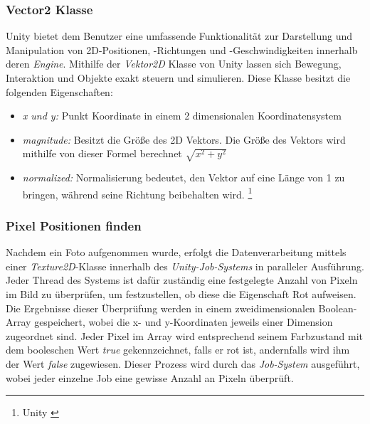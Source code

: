 \subsubsection{\label{sec:Vector2}Vector2 Klasse}
Unity bietet dem Benutzer eine umfassende Funktionalität zur Darstellung und Manipulation von 2D-Positionen, -Richtungen und -Geschwindigkeiten innerhalb deren \textit{Engine}. Mithilfe der \textit{Vektor2D} Klasse von Unity lassen sich Bewegung, Interaktion und Objekte exakt steuern und simulieren. Diese Klasse besitzt die folgenden Eigenschaften:
\begin{itemize}
    \item \textit{x und y: }Punkt Koordinate in einem 2 dimensionalen Koordinatensystem
    \item \textit{magnitude: }Besitzt die Größe des 2D Vektors. Die Größe des Vektors wird mithilfe von dieser Formel berechnet $\sqrt{x^2 + y^2}$
    \item \textit{normalized: }Normalisierung bedeutet, den Vektor auf eine Länge von 1 zu bringen, während seine Richtung beibehalten wird. \protect\footnote{Unity \cite{Vector2}}
\end{itemize}


\subsubsection{Pixel Positionen finden}
Nachdem ein Foto aufgenommen wurde, erfolgt die Datenverarbeitung mittels einer \textit{Texture2D}-Klasse innerhalb des \textit{Unity-Job-Systems} in paralleler Ausführung. Jeder Thread des Systems ist dafür zuständig eine festgelegte Anzahl von Pixeln im Bild zu überprüfen, um festzustellen, ob diese die Eigenschaft Rot aufweisen. Die Ergebnisse dieser Überprüfung werden in einem zweidimensionalen Boolean-Array gespeichert, wobei die x- und y-Koordinaten jeweils einer Dimension zugeordnet sind. Jeder Pixel im Array wird entsprechend seinem Farbzustand mit dem booleschen Wert \textit{true} gekennzeichnet, falls er rot ist, andernfalls wird ihm der Wert \textit{false} zugewiesen. Dieser Prozess wird durch das \textit{Job-System} ausgeführt, wobei jeder einzelne Job eine gewisse Anzahl an Pixeln überprüft.

